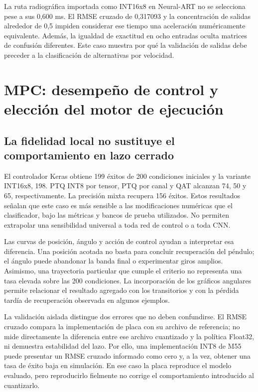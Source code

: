 La ruta radiográfica importada como INT16x8 en Neural-ART no se selecciona pese a sus 0,600 ms. El RMSE cruzado de 0,317093 y la concentración de salidas alrededor de 0,5 impiden considerar ese tiempo una aceleración numéricamente equivalente. Además, la igualdad de exactitud en ocho entradas oculta matrices de confusión diferentes. Este caso muestra por qué la validación de salidas debe preceder a la clasificación de alternativas por velocidad.

\FloatBarrier
\section{MPC: desempeño de control y elección del motor de ejecución}
\subsection{La fidelidad local no sustituye el comportamiento en lazo cerrado}
El controlador Keras obtiene 199 éxitos de 200 condiciones iniciales y la variante INT16x8, 198. PTQ INT8 por tensor, PTQ por canal y QAT alcanzan 74, 50 y 65, respectivamente. La precisión mixta recupera 156 éxitos. Estos resultados señalan que este caso es más sensible a las modificaciones numéricas que el clasificador, bajo las métricas y bancos de prueba utilizados. No permiten extrapolar una sensibilidad universal a toda red de control o a toda CNN.

Las curvas de posición, ángulo y acción de control ayudan a interpretar esa diferencia. Una posición acotada no basta para concluir recuperación del péndulo; el ángulo puede abandonar la banda final o experimentar giros amplios. Asimismo, una trayectoria particular que cumple el criterio no representa una tasa elevada sobre las 200 condiciones. La incorporación de los gráficos angulares permite relacionar el resultado agregado con los transitorios y con la pérdida tardía de recuperación observada en algunos ejemplos.

La validación aislada distingue dos errores que no deben confundirse. El RMSE cruzado compara la implementación de placa con su archivo de referencia; no mide directamente la diferencia entre ese archivo cuantizado y la política Float32, ni demuestra estabilidad del lazo. Por ello, una implementación INT8 de M55 puede presentar un RMSE cruzado informado como cero y, a la vez, obtener una tasa de éxito baja en simulación. En ese caso la placa reproduce el modelo evaluado, pero reproducirlo fielmente no corrige el comportamiento introducido al cuantizarlo.

